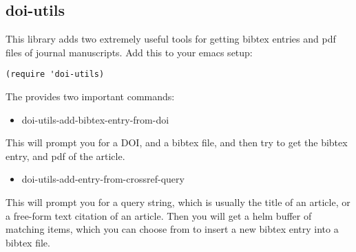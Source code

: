 \documentclass[11pt]{article}
\begin{document}
\subsection{doi-utils}
\label{sec:orgheadline14}

This library adds two extremely useful tools for getting bibtex entries and pdf files of journal manuscripts. Add this to your emacs setup:
\begin{verbatim}
(require 'doi-utils)
\end{verbatim}

The provides two important commands:

\begin{itemize}
\item doi-utils-add-bibtex-entry-from-doi
\end{itemize}
This will prompt you for a DOI, and a bibtex file, and then try to get the bibtex entry, and pdf of the article.

\begin{itemize}
\item doi-utils-add-entry-from-crossref-query
\end{itemize}
This will prompt you for a query string, which is usually the title of an article, or a free-form text citation of an article. Then you will get a helm buffer of matching items, which you can choose from to insert a new bibtex entry into a bibtex file.
\end{document}

